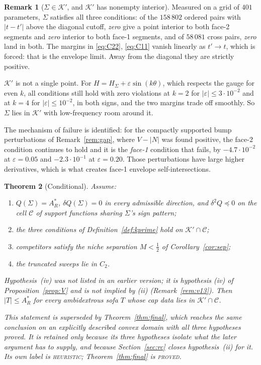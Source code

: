 \documentclass[11pt]{article}
\newtheorem{theorem}{Theorem}
\theoremstyle{definition}
\newtheorem{remark}[theorem]{Remark}
\newcommand{\Sig}{\Sigma}
\begin{document}
\begin{remark}[$\Sig\in\mathcal K'$, and $\mathcal K'$ has nonempty interior]
\label{rem:kprime}
Measured on a grid of $401$ parameters, $\Sig$ satisfies all three conditions: of the
$158\,802$ ordered pairs with $|t-t'|$ above the diagonal cutoff, \emph{zero} give a point
interior to both face-2 segments and \emph{zero} interior to both face-1 segments, and of
$58\,081$ cross pairs, \emph{zero} land in both. The margins in \eqref{eq:C22},
\eqref{eq:C11} vanish linearly as $t'\to t$, which is forced: that is the envelope limit.
Away from the diagonal they are strictly positive.

$\mathcal K'$ is not a single point. For $H=H_\Sig+\varepsilon\sin(k\theta)$, which
respects the gauge for even $k$, all conditions still hold with zero violations at
$k=2$ for $|\varepsilon|\le3\cdot10^{-2}$ and at $k=4$ for $|\varepsilon|\le10^{-2}$, in
both signs, and the two margins trade off smoothly. So $\Sig$ lies in $\mathcal K'$ with
low-frequency room around it.

The mechanism of failure is identified: for the compactly supported bump perturbations of
Remark~\ref{rem:gap}, where $V-|N|$ was found positive, the face-2 condition continues to
hold and it is the \emph{face-1} condition that fails, by $-4.7\cdot10^{-2}$ at
$\varepsilon=0.05$ and $-2.3\cdot10^{-1}$ at $\varepsilon=0.20$. Those perturbations have
large higher derivatives, which is what creates face-1 envelope self-intersections.
\end{remark}

\begin{theorem}[Conditional]\label{thm:cond}
Assume:
\begin{enumerate}
\item[(i)] $Q(\Sig)=A_R^\ast$, $\delta Q(\Sig)=0$ in every admissible direction, and
$\delta^2Q\preceq0$ on the cell $\mathcal C$ of support functions sharing $\Sig$'s sign
pattern;
\item[(ii)] the three conditions of Definition~\ref{def:kprime} hold on
$\mathcal K'\cap\mathcal C$;
\item[(iii)] competitors satisfy the niche separation $M<\tfrac12$ of
Corollary~\ref{cor:sep};
\item[(iv)] the truncated sweeps lie in $C_2$.
\end{enumerate}
Hypothesis~(iv) was not listed in an earlier version; it is hypothesis (iv) of
Proposition~\ref{prop:V} and is not implied by (ii) (Remark~\ref{rem:v13}).
Then $\lvert T\rvert\le A_R^\ast$ for every ambidextrous sofa $T$ whose cap data lies in
$\mathcal K'\cap\mathcal C$.

This statement is \emph{superseded} by Theorem~\ref{thm:final}, which reaches the same
conclusion on an explicitly described convex domain with all three hypotheses proved. It
is retained only because its three hypotheses isolate what the later argument has to
supply, and because Section~\ref{sec:rc} closes hypothesis~(ii) for it. Its own label is
\textnormal{\textsc{heuristic}}; Theorem~\ref{thm:final} is
\textnormal{\textsc{proved}}.
\end{theorem}
\end{document}
